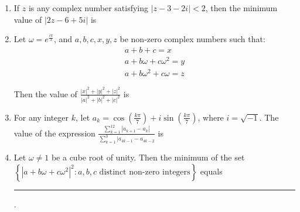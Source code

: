 \documentclass[journal,12pt,twocolumn]{IEEEtran}
\theoremstyle{remark}
\begin{document}
\begin{enumerate}[label=\arabic*)]
	\item If $z$ is any complex number satisfying $|z - 3 - 2i| < 2$, then the
		minimum value of $|2z - 6 + 5i|$ is
		\hspace*{\fill} {\color{magenta}} \\

	\item Let $\omega = e^{\frac{i\pi}3}$, and $a, b, c, x, y, z$ be non-zero complex numbers such that:
		\hspace*{\fill} {\color{magenta}} \\
		\begin{gather*}
			a + b + c = x \\
			a + b\omega + c\omega^2 = y \\
			a + b\omega^2 + c\omega = z 
		\end{gather*}

		Then the value of $\frac {|x|^2 + |y|^2 + |z|^2} {|a|^2 + |b|^2 + |c|^2}$ is

	\item For any integer $k$, let $a_k = \cos(\frac{k\pi}7) + i\sin(\frac{k\pi}7)$, where
		$i = \sqrt{-1}$. The value of the expression $\frac {\sum_{k=1}^{12} |a_{k+1} - a_k|} {\sum_{k=1}^{3} |a_{4k-1} - a_{4k-2}}$ is
		\hspace*{\fill} {\color{magenta}} \\

	\item Let $\omega \ne 1$ be a cube root of unity. Then the minimum of the set $\left\{|a + b\omega + c\omega^2|^2: a,b,c 
		\text{ distinct non-zero integers} \right\}$ equals \rule{1cm}{0.15mm}.
		\hspace*{\fill} {\color{magenta}} \\
\end{enumerate}
\end{document}
